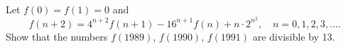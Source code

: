 Let $f(0) = f(1) = 0$ and
\[ f(n+2) = 4^{n+2} f(n+1) - 16^{n+1} f(n) + n \cdot 2^{n^2}, \quad n = 0, 1, 2, 3, \ldots. \]
Show that the numbers $f(1989)$, $f(1990)$, $f(1991)$ are divisible by 13.
